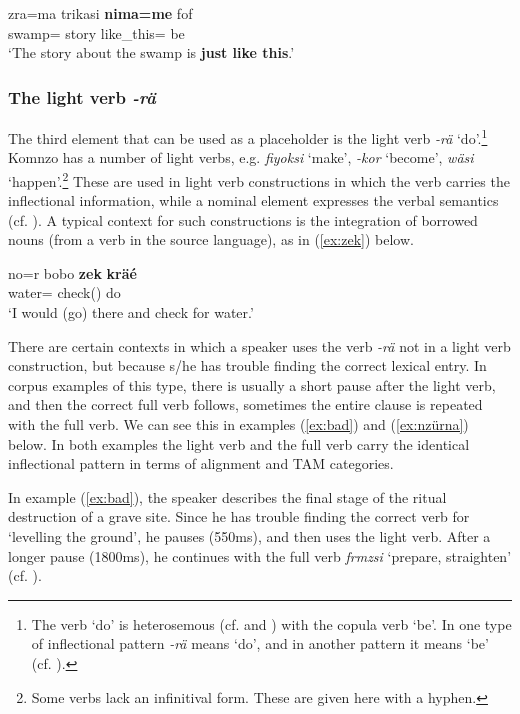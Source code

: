 \documentclass[output=paper,colorlinks,citecolor=brown]{langscibook}
\begin{document}
\ea \label{ex:zra}
    \gll zra=ma trikasi \textbf{nima=me} fof \\
    swamp= story like\_this=  be\\
    \glt `The story about the swamp is \textbf{just like this}.' 
\z

\subsubsection{The light verb \textit{-rä}}\label{sec:doehler:räintro}

The third element that can be used as a placeholder is the light verb \textit{-rä} `do'.\footnote{The verb `do' is heterosemous (cf. \cite{Lichtenberk:1991vt} and \cite{Evans:2010ct}) with the copula verb `be'. In one type of inflectional pattern \textit{-rä} means `do', and in another pattern it means `be' (cf. \cite{Dohler:2023rc}).} Komnzo has a number of light verbs, e.g. \textit{fiyoksi} `make', \textit{-kor} `become', \textit{wäsi} `happen'.\footnote{Some verbs lack an infinitival form. These are given here with a hyphen.} These are used in light verb constructions in which the verb carries the inflectional information, while a nominal element expresses the verbal semantics (cf. \cite[304]{Dohler:2018qt}). A typical context for such constructions is the integration of borrowed nouns (from a verb in the source language), as in (\ref{ex:zek}) below.

\ea \label{ex:zek}
    \gll no=r bobo \textbf{zek} \textbf{kräé}\\
    water=  check() do\\
    \glt `I would (go) there and check for water.' 
\z

There are certain contexts in which a speaker uses the verb \textit{-rä} not in a light verb construction, but because s/he has trouble finding the correct lexical entry. In corpus examples of this type, there is usually a short pause after the light verb, and then the correct full verb follows, sometimes the entire clause is repeated with the full verb. We can see this in examples (\ref{ex:bad}) and (\ref{ex:nzürna}) below. In both examples the light verb and the full verb carry the identical inflectional pattern in terms of alignment and TAM categories.

In example (\ref{ex:bad}), the speaker describes the final stage of the ritual destruction of a grave site. Since he has trouble finding the correct verb for `levelling the ground', he pauses (550ms), and then uses the light verb. After a longer pause (1800ms), he continues with the full verb \textit{frmzsi} `prepare, straighten' (cf. ).
\end{document}

